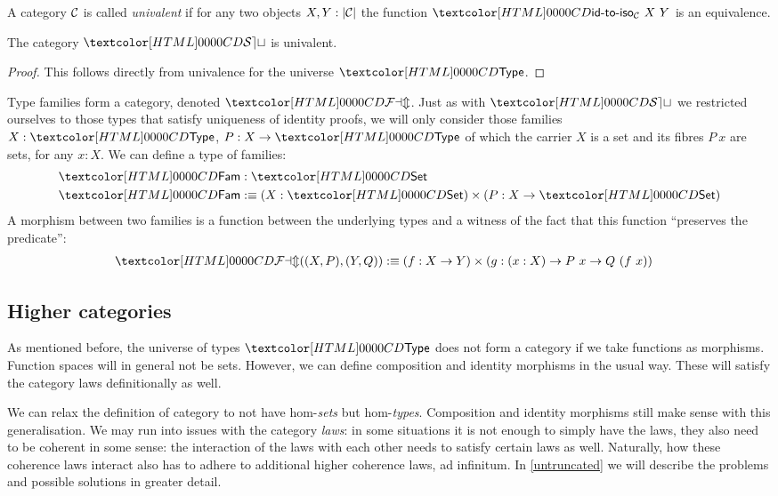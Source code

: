 \begin{definition}
  A category $\mathcal{C}$ is called \emph{univalent} if for any two objects
  $X, Y : | \mathcal{C} |$ the function $\idtoiso_{\Cc}\ X\ Y$ is an
  equivalence.
\end{definition}

\begin{proposition}
  The category $\SET$ is univalent.
\end{proposition}

\begin{proof}
  This follows directly from univalence for the universe $\Type$.
\end{proof}

\begin{example}
  Type families form a category, denoted $\FAM$. Just as with $\SET$
  we restricted ourselves to those types that satisfy uniqueness of
  identity proofs, we will only consider those families $X : \Type$,
  $P : X \to \Type$ of which the carrier $X$ is a set and its fibres
  $P\ x$ are sets, for any $x : X$. We can define a type of families:
  \begin{align*}
    &\Fam : \Set \\
    &\Fam \ddefeq (X : \Set) \times (P : X \to \Set)
  \end{align*}
  A morphism between two families is a function between the underlying
  types and a witness of the fact that this function ``preserves the
  predicate'':
  \begin{align*}
    &\FAM((X,P),(Y,Q)) \ddefeq (f : X \to Y) \times (g : (x : X) \to P\ x \to Q\ (f\ x))
  \end{align*}
\end{example}

\subsection{Higher categories}
\label{higher-cats}

As mentioned before, the universe of types $\Type$ does not form a
category if we take functions as morphisms. Function spaces will in
general not be sets. However, we can define composition and identity
morphisms in the usual way. These will satisfy the category laws
definitionally as well.

We can relax the definition of category to not have hom-\emph{sets}
but hom-\emph{types}. Composition and identity morphisms still make
sense with this generalisation. We may run into issues with the
category \emph{laws}: in some situations it is not enough to simply
have the laws, they also need to be coherent in some sense: the
interaction of the laws with each other needs to satisfy certain laws
as well. Naturally, how these coherence laws interact also has to
adhere to additional higher coherence laws, ad infinitum. In
\cref{untruncated} we will describe the problems and possible
solutions in greater detail.
